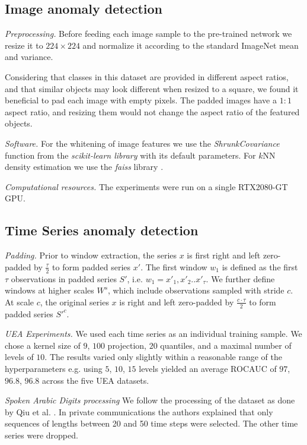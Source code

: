 \documentclass{article}
\begin{document}
\subsection{Image anomaly detection}
\label{app:imp_image}

 \textit{Preprocessing.} Before feeding each image sample to the pre-trained network we resize it to $224 \times 224$ and normalize it according to the standard ImageNet mean and variance.
 
 Considering that classes in this dataset are provided in different aspect ratios, and that similar objects may look different when resized to a square, we found it beneficial to pad each image with empty pixels. The padded images have a $1:1$ aspect ratio, and resizing them would not change the aspect ratio of the featured objects.



\textit{Software.} 
For the whitening of image features we use the \textit{ShrunkCovariance} function from the \textit{scikit-learn library} \cite{scikit-learn} with its default parameters. For $k$NN density estimation we use the \textit{faiss} library \cite{johnson2019billion}.

\textit{Computational resources.} The experiments were run on a single RTX2080-GT GPU.


\subsection{Time Series  anomaly detection}
\label{app:imp_ts}

\textit{Padding.} Prior to window extraction, the series $x$ is first right and left zero-padded by $\frac{\tau}{2}$ to form padded series $x'$. The first window $w_1$ is defined as the first $\tau$ observations in padded series $S'$, i.e. $w_1 = x'_1,x'_2..x'_{\tau}$. We further define windows at higher scales $W^s$, which include observations sampled with stride $c$. At scale $c$, the original series $x$ is right and left zero-padded by $\frac{c \cdot \tau}{2}$ to form padded series $S'^c$. 

\textit{UEA Experiments.} We used each time series as an individual training sample. We chose a kernel size of $9$, $100$ projection, $20$ quantiles, and a maximal number of levels of $10$. The results varied only slightly within a reasonable range of the hyperparameters e.g. using $5$, $10$, $15$ levels yielded an average ROCAUC of $97$, $96.8$, $96.8$ across the five UEA datasets.

\textit{Spoken Arabic Digits processing}  We follow the processing of the dataset as done by Qiu et al. \cite{qiu2021neural}.
 In private communications the authors explained that only sequences of lengths between 20 and 50 time steps were selected. The other time series were dropped.
\end{document}
